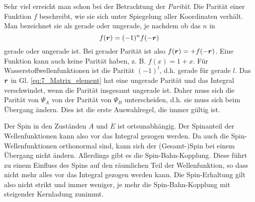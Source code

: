 Sehr viel erreicht man schon bei der Betrachtung der  \emph{Parität}. Die Parität einer Funktion $f$ beschreibt, wie sie sich unter Spiegelung aller Koordinaten verhält. Man bezeichnet sie als gerade oder ungerade, je nachdem ob das $n$ in 
\begin{equation}
    f(\boldsymbol{r}) = (-1)^n f(- \boldsymbol{r})
\end{equation}
gerade oder ungerade ist. Bei gerader Parität ist also $f(\boldsymbol{r}) = + f(- \boldsymbol{r}) $.
Eine Funktion kann auch keine Parität haben, z. B. $f(x) = 1 + x$. Für Wasserstoffwellenfunktionen ist die Parität $(-1)^l$, d.h. gerade für gerade $l$. Das $\boldsymbol{r}$ in Gl. \ref{eq:7_Matrix_element} hat eine ungerade Parität und das Integral verschwindet, wenn die Parität insgesamt ungerade ist. Daher muss sich die Parität von $\Psi_A$ von der Parität von $\Psi_B$ unterscheiden, d.h. sie muss sich beim Übergang ändern. Dies ist die erste Auswahlregel, die immer gültig ist.

Der Spin in den Zuständen $A$ und $E$ ist ortsunabhängig. Der Spinanteil der Wellenfunktionen kann also vor das Integral gezogen werden. Da auch die Spin-Wellenfunktionen orthonormal sind, kann sich der (Gesamt-)Spin bei einem Übergang nicht ändern. Allerdings gibt es die Spin-Bahn-Kopplung. Diese führt zu einem Einfluss des Spins auf den räumlichen Teil der Wellenfunktion, so dass nicht mehr alles vor das Integral gezogen werden kann. Die Spin-Erhaltung gilt also nicht strikt und immer weniger, je mehr die Spin-Bahn-Kopplung mit steigender Kernladung zunimmt.


